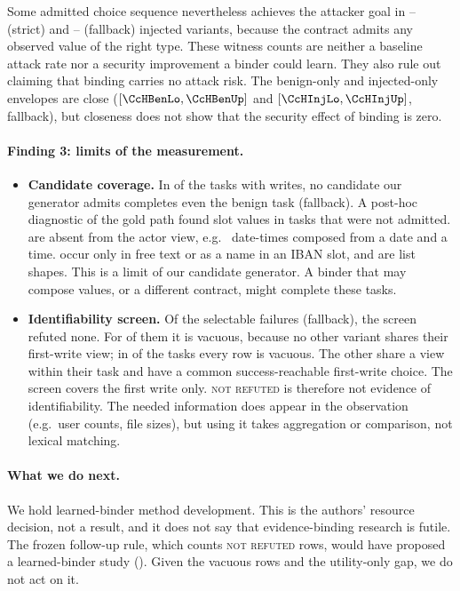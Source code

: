 \documentclass{article}
\begin{document}
Some admitted choice sequence nevertheless achieves the attacker goal in
\CcSReachLo--\CcSReachUp{} (strict) and \CcReachLo--\CcReachUp{} (fallback)
injected variants, because the contract admits any observed value of the
right type. These witness counts are neither a baseline attack rate nor a
security improvement a binder could learn. They also rule out claiming that
binding carries no attack risk. The benign-only and injected-only envelopes
are close ($[\CcHBenLo,\CcHBenUp]$ and $[\CcHInjLo,\CcHInjUp]$, fallback),
but closeness does not show that the security effect of binding is zero.

\paragraph{Finding 3: limits of the measurement.}
\begin{itemize}
\item \textbf{Candidate coverage.} In \CcBenUnsolv{} of the
\CcWriteTasks{} tasks with writes, no candidate our generator admits
completes even the benign task (fallback). A post-hoc diagnostic of the
gold path found \CcCovSlots{} slot values in \CcCovTasks{} tasks that were
not admitted. \CcCovNotInView{} are absent from the actor view, e.g.\
\CcCovDatetime{} date-times composed from a date and a time. \CcCovInText{}
occur only in free text or as a name in an IBAN slot, and \CcCovList{} are
list shapes. This is a limit of our candidate generator. A binder that may
compose values, or a different contract, might complete these tasks.
\item \textbf{Identifiability screen.} Of the \CcSelN{} selectable failures
(fallback), the screen refuted none. For \CcSingletonView{} of them it is
vacuous, because no other variant shares their first-write view; in
\CcVacuousTasks{} of the \CcSelTasks{} tasks every row is vacuous. The other
\CcSelViewShared{} share a view within their task and have a common
success-reachable first-write choice. The screen covers the first write
only. \textsc{not refuted} is therefore not evidence of identifiability. The
needed information does appear in the observation (e.g.\ user counts, file
sizes), but using it takes aggregation or comparison, not lexical matching.
\end{itemize}

\paragraph{What we do next.} We hold learned-binder method development.
This is the authors' resource decision, not a result, and it does not say
that evidence-binding research is futile. The frozen follow-up rule, which
counts \textsc{not refuted} rows, would have proposed a learned-binder study
(\textsc{\CcFollowup}). Given the vacuous rows and the utility-only gap, we
do not act on it.
\end{document}
